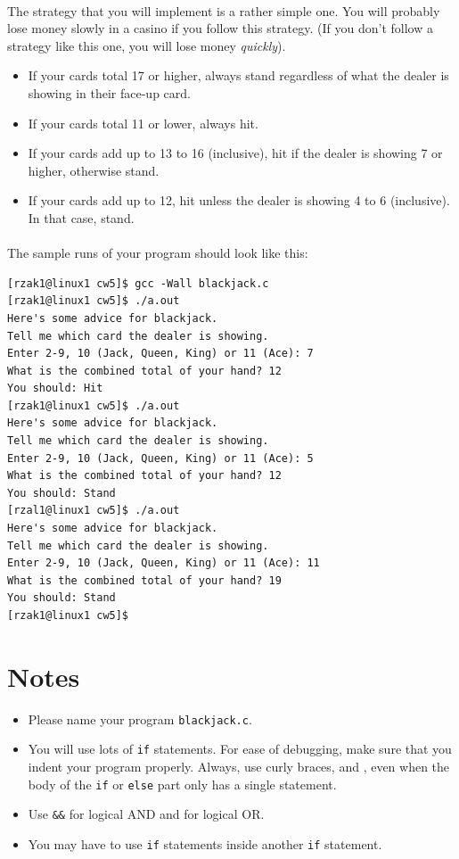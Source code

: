 \documentclass[letter,11pt]{article}
\begin{document}
\paragraph{}The strategy that you will implement is a rather simple one. You will probably lose money slowly in a casino if you follow this strategy. (If you don't follow a strategy like this one, you will lose money \textit{quickly}).
\begin{itemize}
    \item If your cards total 17 or higher, always stand regardless of what the dealer is showing in their face-up card.
    \item If your cards total 11 or lower, always hit.
    \item If your cards add up to 13 to 16 (inclusive), hit if the dealer is showing 7 or higher, otherwise stand.
    \item If your cards add up to 12, hit unless the dealer is showing 4 to 6 (inclusive). In that case, stand.
\end{itemize}

\paragraph{}The sample runs of your program should look like this:
\begin{verbatim}
[rzak1@linux1 cw5]$ gcc -Wall blackjack.c
[rzak1@linux1 cw5]$ ./a.out
Here's some advice for blackjack.
Tell me which card the dealer is showing.
Enter 2-9, 10 (Jack, Queen, King) or 11 (Ace): 7
What is the combined total of your hand? 12
You should: Hit
[rzak1@linux1 cw5]$ ./a.out
Here's some advice for blackjack.
Tell me which card the dealer is showing.
Enter 2-9, 10 (Jack, Queen, King) or 11 (Ace): 5
What is the combined total of your hand? 12
You should: Stand
[rzal1@linux1 cw5]$ ./a.out
Here's some advice for blackjack.
Tell me which card the dealer is showing.
Enter 2-9, 10 (Jack, Queen, King) or 11 (Ace): 11
What is the combined total of your hand? 19
You should: Stand
[rzak1@linux1 cw5]$ 
\end{verbatim}

\section*{Notes}
\begin{itemize}
    \item Please name your program \texttt{blackjack.c}.
    \item You will use lots of \texttt{if} statements. For ease of debugging, make sure that you indent your program properly. Always, use curly braces, { and }, even when the body of the \texttt{if} or \texttt{else} part only has a single statement.
    \item Use \texttt{\&\&} for logical AND and \texttt{\textbar\textbar} for logical OR.
    \item You may have to use \texttt{if} statements inside another \texttt{if} statement.
\end{itemize}
\end{document}
